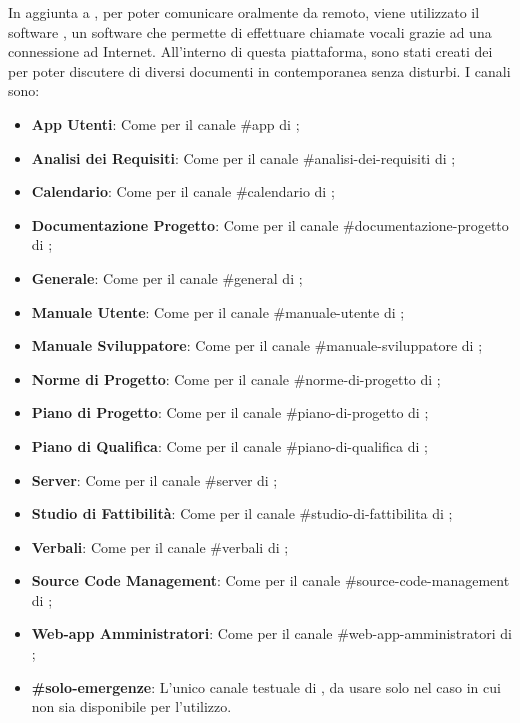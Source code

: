 In aggiunta a , per poter comunicare oralmente da remoto, viene utilizzato il software , un software che permette di effettuare chiamate vocali grazie ad una connessione ad Internet.
All'interno di questa piattaforma, sono stati creati dei  per poter discutere di diversi documenti in contemporanea senza disturbi.
I canali sono:
\begin{itemize}
	\item \textbf{App Utenti}: Come per il canale \#app di ;
	\item \textbf{Analisi dei Requisiti}: Come per il canale \#analisi-dei-requisiti di ;
	\item \textbf{Calendario}: Come per il canale \#calendario di ;
	\item \textbf{Documentazione Progetto}: Come per il canale \#documentazione-progetto di ;
	\item \textbf{Generale}: Come per il canale \#general di ;
	\item \textbf{Manuale Utente}: Come per il canale \#manuale-utente di ;
	\item \textbf{Manuale Sviluppatore}: Come per il canale \#manuale-sviluppatore di ;
	\item \textbf{Norme di Progetto}: Come per il canale \#norme-di-progetto di ;
    \item \textbf{Piano di Progetto}: Come per il canale \#piano-di-progetto di ;
	\item \textbf{Piano di Qualifica}: Come per il canale \#piano-di-qualifica di ;
	\item \textbf{Server}: Come per il canale \#server di ;
	\item \textbf{Studio di Fattibilità}: Come per il canale \#studio-di-fattibilita di ;
	\item \textbf{Verbali}: Come per il canale \#verbali di ;
	\item \textbf{Source Code Management}: Come per il canale \#source-code-management di ;
	\item \textbf{Web-app Amministratori}: Come per il canale \#web-app-amministratori di ;
	\item \textbf{\#solo-emergenze}: L'unico canale testuale di , da usare solo nel caso in cui  non sia disponibile per l'utilizzo.
\end{itemize}

